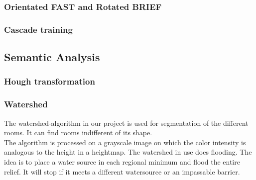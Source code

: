\subsubsection{Orientated FAST and Rotated BRIEF}
\subsubsection{Cascade training}
\subsection{Semantic Analysis}
\subsubsection{Hough transformation}
\subsubsection{Watershed}
The watershed-algorithm in our project is used for segmentation of the different rooms. It can find rooms indifferent of its shape.
\\
The algorithm is processed on a grayscale image on which the color intensity is analogous to the height in a heightmap. The watershed in use does flooding. The idea is to place a water source in each regional minimum and flood the entire relief. It will stop if it meets a different watersource or an impassable barrier.
